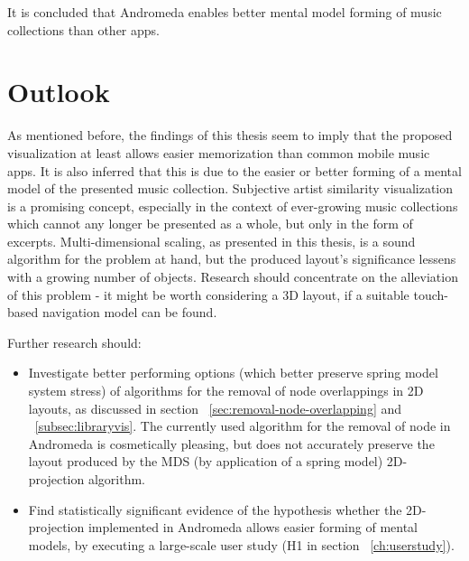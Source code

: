  It is concluded that Andromeda enables better mental model forming of music collections than other apps.

\section{Outlook}

As mentioned before, the findings of this thesis seem to imply that the proposed visualization at least allows easier memorization than common mobile music apps. It is also inferred that this is due to the easier or better forming of a mental model of the presented music collection. Subjective artist similarity visualization is a promising concept, especially in the context of ever-growing music collections which cannot any longer be presented as a whole, but only in the form of excerpts. Multi-dimensional scaling, as presented in this thesis, is a sound algorithm for the problem at hand, but the produced layout's significance lessens with a growing number of objects. Research should concentrate on the alleviation of this problem - it might be worth considering a 3D layout, if a suitable touch-based navigation model can be found.

Further research should:
\begin{itemize}
  \item Investigate better performing options (which better preserve spring model system stress) of algorithms for the removal of node overlappings in 2D layouts, as discussed in section ~\ref{sec:removal-node-overlapping} and ~\ref{subsec:libraryvis}. The currently used algorithm for the removal of node in Andromeda is cosmetically pleasing, but does not accurately preserve the layout produced by the MDS (by application of a spring model) 2D-projection algorithm.


  \item Find statistically significant evidence of the hypothesis whether the 2D-projection implemented in Andromeda allows easier forming of mental models, by executing a large-scale user study (H1 in section ~\ref{ch:userstudy}).

\end{itemize}